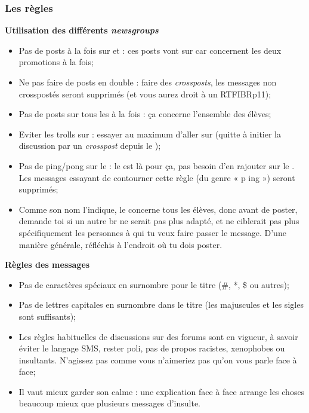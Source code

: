 \subsubsection{Les règles}
\textbf{Utilisation des différents \emph{newsgroups}}
\begin{itemize}

 \item Pas de posts à la fois sur  et  : ces posts vont sur  car concernent les deux promotions à la fois;
 \item Ne pas faire de posts en double : faire des \emph{crossposts}, les messages non crosspostés seront supprimés (et vous aurez droit à un RTFIBRp11);
 \item Pas de posts sur tous les  à la fois : ça concerne l'ensemble des élèves;
 \item Eviter les trolls sur  : essayer au maximum d'aller sur  (quitte à initier la discussion par un \emph{crosspost} depuis le );
 \item Pas de ping/pong sur le  : le  est là pour ça, pas besoin d'en rajouter sur le . Les messages essayant de contourner cette règle (du genre « p ing ») seront supprimés;
 \item Comme son nom l'indique, le  concerne tous les élèves, donc avant de poster, demande toi si un autre br ne serait pas plus adapté, et ne ciblerait pas plus spécifiquement les personnes à qui tu veux faire passer le message. D'une manière générale, réfléchis à l'endroit où tu dois poster.

\end{itemize}

\textbf{Règles des messages}
\begin{itemize}
 \item Pas de caractères spéciaux en surnombre pour le titre (\#, *, \$ ou autres);
 \item Pas de lettres capitales en surnombre dans le titre (les majuscules et les sigles sont suffisants);
 \item Les règles habituelles de discussions sur des forums sont en vigueur, à savoir éviter le langage SMS, rester poli, pas de propos racistes, xenophobes ou insultants. N'agissez pas comme vous n'aimeriez pas qu'on vous parle face à face;
 \item Il vaut mieux garder son calme : une explication face à face arrange les choses beaucoup mieux que plusieurs messages d'insulte.
\end{itemize}

